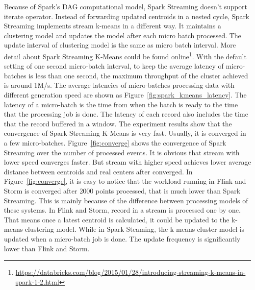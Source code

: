 Because of Spark's DAG computational model, Spark Streaming doesn't support iterate operator. Instead of forwarding updated centroids in a nested cycle, Spark Streaming implements stream k-means in a different way. It maintains a clustering model and updates the model after each micro batch processed. The update interval of clustering model is the same as micro batch interval. More detail about Spark Streaming K-Means could be found online\footnote{\url{https://databricks.com/blog/2015/01/28/introducing-streaming-k-means-in-spark-1-2.html}}. With the default setting of one second micro-batch interval, to keep  the average latency of micro-batches is less than one second, the maximum throughput of the cluster achieved is around 1M/s. The average latencies of micro-batches processing data with different generation speed are shown as Figure~\ref{fig:spark_kmeans_latency}. The latency of a micro-batch is the time from when the batch is ready to the time that the processing job is done. The latency of each record also includes the time that the record buffered in a window.
The experiment results show that the convergence of Spark Streaming K-Means is very fast. Usually, it is converged in a few micro-batches. Figure~\ref{fig:converge} shows the convergence of Spark Streaming over the number of processed events. It is obvious that stream with lower speed converges faster. But stream with higher speed achieves lower average distance between centroids and real centers after converged. In Figure~\ref{fig:converge}, it is easy to notice that the workload running in Flink and Storm is converged after 2000 points processed, that is much lower than Spark Streaming. This is mainly because of the difference between processing models of these systems. In Flink and Storm, record in a stream is processed one by one. That means once a latest centroid is calculated, it could be updated to the k-means clustering model. While in Spark Steaming, the k-means cluster model is updated when a micro-batch job is done. The update frequency is significantly lower than Flink and Storm.
 

